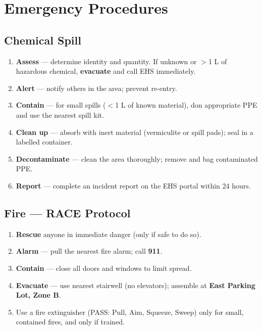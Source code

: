 \section{Emergency Procedures}

\subsection{Chemical Spill}
\begin{enumerate}[noitemsep, topsep=2pt, leftmargin=1.6em, label=\textcolor{accent}{\bfseries\arabic*.}]
  \item \textbf{Assess} --- determine identity and quantity. If unknown or $>$1 L of hazardous chemical, \textbf{evacuate} and call EHS immediately.
  \item \textbf{Alert} --- notify others in the area; prevent re-entry.
  \item \textbf{Contain} --- for small spills ($<$1 L of known material), don appropriate PPE and use the nearest spill kit.
  \item \textbf{Clean up} --- absorb with inert material (vermiculite or spill pads); seal in a labelled container.
  \item \textbf{Decontaminate} --- clean the area thoroughly; remove and bag contaminated PPE.
  \item \textbf{Report} --- complete an incident report on the EHS portal within 24 hours.
\end{enumerate}

\subsection{Fire --- RACE Protocol}
\begin{enumerate}[noitemsep, topsep=2pt, leftmargin=1.6em, label=\textcolor{accent}{\bfseries\arabic*.}]
  \item \textbf{Rescue} anyone in immediate danger (only if safe to do so).
  \item \textbf{Alarm} --- pull the nearest fire alarm; call \textbf{911}.
  \item \textbf{Contain} --- close all doors and windows to limit spread.
  \item \textbf{Evacuate} --- use nearest stairwell (no elevators); assemble at \textbf{East Parking Lot, Zone B}.
  \item Use a fire extinguisher (PASS: Pull, Aim, Squeeze, Sweep) only for small, contained fires, and only if trained.
\end{enumerate}

